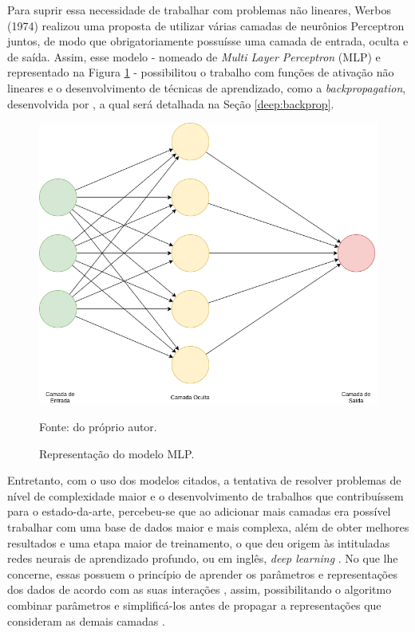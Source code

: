 Para suprir essa necessidade de trabalhar com problemas não lineares, Werbos (1974) \cite{Werbos:74} realizou uma proposta de utilizar várias camadas de neurônios Perceptron juntos, de modo que obrigatoriamente possuísse uma camada de entrada, oculta e de saída. Assim, esse modelo - nomeado de \textit{Multi Layer Perceptron} (MLP) \cite{Werbos:74} e representado na Figura \ref{deep:fig:4} - possibilitou o trabalho com funções de ativação não lineares e o desenvolvimento de técnicas de aprendizado, como a \textit{backpropagation}, desenvolvida por \cite{rumelhart1986learning}, a qual será detalhada na Seção \ref{deep:backprop}.

\begin{figure}[H]
    \centering
    \caption{Representação do modelo MLP.}
    \includegraphics[width=1\linewidth]{recursos/imagens/deep/mlp.png}
    \label{deep:fig:4}

    \vspace*{1 cm}
    Fonte: do próprio autor.
\end{figure}

Entretanto, com o uso dos modelos citados, a tentativa de resolver problemas de nível de complexidade maior e o desenvolvimento de trabalhos que contribuíssem para o estado-da-arte, percebeu-se que ao adicionar mais camadas era possível trabalhar com uma base de dados maior e mais complexa, além de obter melhores resultados e uma etapa maior de treinamento, o que deu origem às intituladas redes neurais de aprendizado profundo, ou em inglês, \textit{deep learning} \cite{Goodfellow2016}. No que lhe concerne, essas possuem o princípio de aprender os parâmetros e representações dos dados de acordo com as suas interações \cite{ponti2018funciona}, assim, possibilitando o algoritmo combinar parâmetros e simplificá-los antes de propagar a representações que consideram as demais camadas \cite{Goodfellow2016}.

